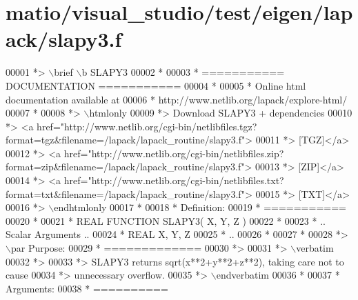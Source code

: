 \hypertarget{matio_2visual__studio_2test_2eigen_2lapack_2slapy3_8f_source}{}\section{matio/visual\+\_\+studio/test/eigen/lapack/slapy3.f}
\label{matio_2visual__studio_2test_2eigen_2lapack_2slapy3_8f_source}

\begin{DoxyCode}
00001 \textcolor{comment}{*> \(\backslash\)brief \(\backslash\)b SLAPY3}
00002 \textcolor{comment}{*}
00003 \textcolor{comment}{*  =========== DOCUMENTATION ===========}
00004 \textcolor{comment}{*}
00005 \textcolor{comment}{* Online html documentation available at }
00006 \textcolor{comment}{*            http://www.netlib.org/lapack/explore-html/ }
00007 \textcolor{comment}{*}
00008 \textcolor{comment}{*> \(\backslash\)htmlonly}
00009 \textcolor{comment}{*> Download SLAPY3 + dependencies }
00010 \textcolor{comment}{*> <a
       href="http://www.netlib.org/cgi-bin/netlibfiles.tgz?format=tgz&filename=/lapack/lapack\_routine/slapy3.f"> }
00011 \textcolor{comment}{*> [TGZ]</a> }
00012 \textcolor{comment}{*> <a
       href="http://www.netlib.org/cgi-bin/netlibfiles.zip?format=zip&filename=/lapack/lapack\_routine/slapy3.f"> }
00013 \textcolor{comment}{*> [ZIP]</a> }
00014 \textcolor{comment}{*> <a
       href="http://www.netlib.org/cgi-bin/netlibfiles.txt?format=txt&filename=/lapack/lapack\_routine/slapy3.f"> }
00015 \textcolor{comment}{*> [TXT]</a>}
00016 \textcolor{comment}{*> \(\backslash\)endhtmlonly }
00017 \textcolor{comment}{*}
00018 \textcolor{comment}{*  Definition:}
00019 \textcolor{comment}{*  ===========}
00020 \textcolor{comment}{*}
00021 \textcolor{comment}{*       REAL             FUNCTION SLAPY3( X, Y, Z )}
00022 \textcolor{comment}{* }
00023 \textcolor{comment}{*       .. Scalar Arguments ..}
00024 \textcolor{comment}{*       REAL               X, Y, Z}
00025 \textcolor{comment}{*       ..}
00026 \textcolor{comment}{*  }
00027 \textcolor{comment}{*}
00028 \textcolor{comment}{*> \(\backslash\)par Purpose:}
00029 \textcolor{comment}{*  =============}
00030 \textcolor{comment}{*>}
00031 \textcolor{comment}{*> \(\backslash\)verbatim}
00032 \textcolor{comment}{*>}
00033 \textcolor{comment}{*> SLAPY3 returns sqrt(x**2+y**2+z**2), taking care not to cause}
00034 \textcolor{comment}{*> unnecessary overflow.}
00035 \textcolor{comment}{*> \(\backslash\)endverbatim}
00036 \textcolor{comment}{*}
00037 \textcolor{comment}{*  Arguments:}
00038 \textcolor{comment}{*  ==========}

\end{DoxyCode}
